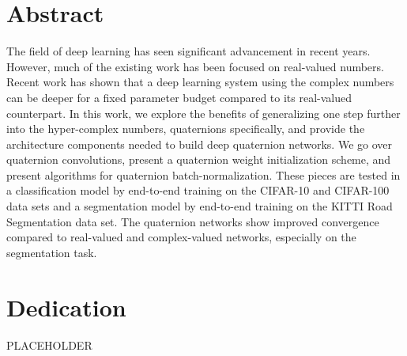 \documentclass[12pt]{report}
\begin{document}
\pagestyle{empty} %






\chapter*{Abstract}
The field of deep learning has seen significant advancement in recent years.
However, much of the existing work has been focused on real-valued numbers.
Recent work has shown that a deep learning system using the complex numbers can be deeper for a fixed parameter budget compared to its real-valued counterpart.
In this work, we explore the benefits of generalizing one step further into the hyper-complex numbers, quaternions specifically, and provide the architecture components needed to build deep quaternion networks.
We go over quaternion convolutions, present a quaternion weight initialization scheme, and present algorithms for quaternion batch-normalization.
These pieces are tested in a classification model by end-to-end training on the CIFAR-10 and CIFAR-100 data sets and a segmentation model by end-to-end training on the KITTI Road Segmentation data set. 
The quaternion networks show improved convergence compared to real-valued and complex-valued networks, especially on the segmentation task.


\chapter*{Dedication}
PLACEHOLDER


\tableofcontents %
\cleardoublepage %
\end{document}
